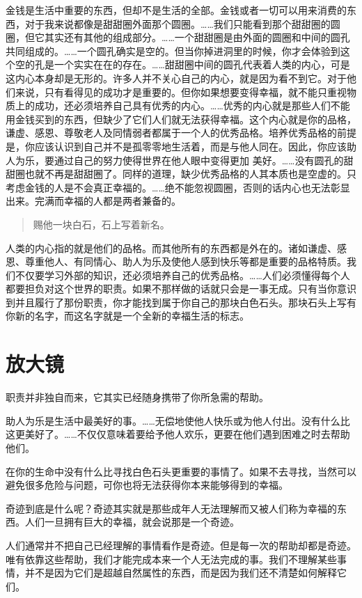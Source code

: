 \documentclass[fontset=founder]{ctexart}
\begin{document}
金钱是生活中重要的东西，但却不是生活的全部。金钱或者一切可以用来消费的东西，对于我来说都像是甜甜圈外面那个圆圈。……我们只能看到那个甜甜圈的圆圈，但它其实还有其他的组成部分。……一个甜甜圈是由外面的圆圈和中间的圆孔共同组成的。……一个圆孔确实是空的。但当你掉进洞里的时候，你才会体验到这个空的孔是一个实实在在的存在。……甜甜圈中间的圆孔代表着人类的内心，可是这内心本身却是无形的。许多人并不关心自己的内心，就是因为看不到它。对于他们来说，只有看得见的成功才是重要的。但你如果想要变得幸福，就不能只重视物质上的成功，还必须培养自己具有优秀的内心。……优秀的内心就是那些人们不能用金钱买到的东西，但缺少了它们人们就无法获得幸福。这个内心就是你的品格，谦虚、感恩、尊敬老人及同情弱者都属于一个人的优秀品格。培养优秀品格的前提是，你应该认识到自己并不是孤零零地生活着，而是与他人同在。因此，你应该助人为乐，要通过自己的努力使得世界在他人眼中变得更加
美好。……没有圆孔的甜甜圈也就不再是甜甜圈了。同样的道理，缺少优秀品格的人其本质也是空虚的。只考虑金钱的人是不会真正幸福的。……绝不能忽视圆圈，否则的话内心也无法彰显出来。完满而幸福的人都是两者兼备的。

\begin{quote}
    赐他一块白石，石上写着新名。
\end{quote}

人类的内心指的就是他们的品格。而其他所有的东西都是外在的。诸如谦虚、感恩、尊重他人、有同情心、助人为乐及使他人感到快乐等都是重要的品格特质。我们不仅要学习外部的知识，还必须培养自己的优秀品格。……人们必须懂得每个人都要担负对这个世界的职责。如果不那样做的话就只会是一事无成。只有当你意识到并且履行了那份职责，你才能找到属于你自己的那块白色石头。那块石头上写有你新的名字，而这名字就是一个全新的幸福生活的标志。

\section{放大镜}

职责并非独自而来，它其实已经随身携带了你所急需的帮助。

助人为乐是生活中最美好的事。……无偿地使他人快乐或为他人付出。没有什么比这更美好了。……不仅仅意味着要给予他人欢乐，更要在他们遇到困难之时去帮助他们。

在你的生命中没有什么比寻找白色石头更重要的事情了。如果不去寻找，当然可以避免很多危险与问题，可你也将无法获得你本来能够得到的幸福。

奇迹到底是什么呢？奇迹其实就是那些成年人无法理解而又被人们称为幸福的东西。人们一旦拥有巨大的幸福，就会说那是一个奇迹。

人们通常并不把自己已经理解的事情看作是奇迹。但是每一次的帮助却都是奇迹。唯有依靠这些帮助，我们才能完成本来一个人无法完成的事。我们不理解某些事情，并不是因为它们是超越自然属性的东西，而是因为我们还不清楚如何解释它们。
\end{document}
